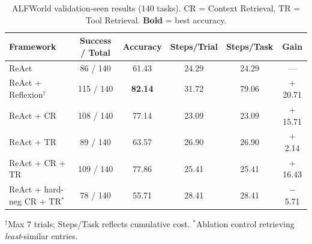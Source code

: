 \begin{table}[t]
\centering
\caption{ALFWorld validation-seen results (140 tasks). CR = Context Retrieval, TR = Tool Retrieval. \textbf{Bold} = best accuracy.}
\label{tab:alfworld-seen}
\begin{tabular}{lccccc}
\toprule
Framework & Success / Total & Accuracy & Steps/Trial & Steps/Task & Gain \\
\midrule
ReAct                             &  86 / 140 & 61.43 & 24.29 & 24.29 & --- \\
ReAct + Reflexion$^\dagger$       & 115 / 140 & \textbf{82.14} & 31.72 & 79.06 & $+$20.71 \\
ReAct + CR                        & 108 / 140 & 77.14 & 23.09 & 23.09 & $+$15.71 \\
ReAct + TR                        &  89 / 140 & 63.57 & 26.90 & 26.90 & $+$2.14 \\
ReAct + CR + TR                   & 109 / 140 & 77.86 & 25.41 & 25.41 & $+$16.43 \\
ReAct + hard-neg CR + TR$^*$      &  78 / 140 & 55.71 & 28.41 & 28.41 & $-$5.71 \\
\bottomrule
\end{tabular}
\vspace{2pt}

{\footnotesize $^\dagger$Max 7 trials; Steps/Task reflects cumulative cost. $^*$Ablation control retrieving \emph{least}-similar entries.}
\end{table}
